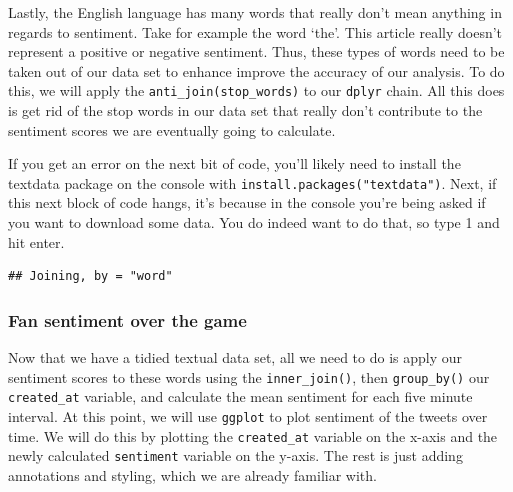 \documentclass[
]{book}
\newenvironment{Shaded}{\begin{snugshade}}{\end{snugshade}}
\newcommand{\KeywordTok}[1]{\textcolor[rgb]{0.13,0.29,0.53}{\textbf{#1}}}
\newcommand{\NormalTok}[1]{#1}
\newcommand{\OperatorTok}[1]{\textcolor[rgb]{0.81,0.36,0.00}{\textbf{#1}}}
\newcommand{\StringTok}[1]{\textcolor[rgb]{0.31,0.60,0.02}{#1}}
\begin{document}
Lastly, the English language has many words that really don't mean anything in regards to sentiment. Take for example the word `the'. This article really doesn't represent a positive or negative sentiment. Thus, these types of words need to be taken out of our data set to enhance improve the accuracy of our analysis. To do this, we will apply the \texttt{anti\_join(stop\_words)} to our \texttt{dplyr} chain. All this does is get rid of the stop words in our data set that really don't contribute to the sentiment scores we are eventually going to calculate.

If you get an error on the next bit of code, you'll likely need to install the textdata package on the console with \texttt{install.packages("textdata")}. Next, if this next block of code hangs, it's because in the console you're being asked if you want to download some data. You do indeed want to do that, so type 1 and hit enter.

\begin{Shaded}
\end{Shaded}

\begin{verbatim}
## Joining, by = "word"
\end{verbatim}

\hypertarget{fan-sentiment-over-the-game}{%
\subsubsection{Fan sentiment over the game}\label{fan-sentiment-over-the-game}}

Now that we have a tidied textual data set, all we need to do is apply our sentiment scores to these words using the \texttt{inner\_join()}, then \texttt{group\_by()} our \texttt{created\_at} variable, and calculate the mean sentiment for each five minute interval. At this point, we will use \texttt{ggplot} to plot sentiment of the tweets over time. We will do this by plotting the \texttt{created\_at} variable on the x-axis and the newly calculated \texttt{sentiment} variable on the y-axis. The rest is just adding annotations and styling, which we are already familiar with.
\end{document}
